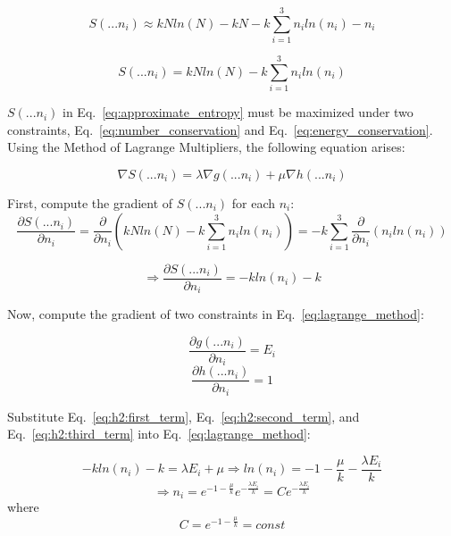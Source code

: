 \documentclass{article}
\begin{document}
\[
  S(...n_i) \approx kNln(N) - kN - k\sum_{i=1}^{3}{n_iln(n_i) - n_i}
\]

\begin{equation} \label{eq:approximate_entropy}
  S(...n_i) = kNln(N) - k\sum_{i=1}^{3}{n_iln(n_i)}
\end{equation}

$S(...n_i)$ in Eq.~\eqref{eq:approximate_entropy} must be maximized under two constraints, Eq.~\eqref{eq:number_conservation} and Eq.~\eqref{eq:energy_conservation}. Using the Method of Lagrange Multipliers, the following equation arises:

\begin{equation} \label{eq:lagrange_method}
  \nabla S(...n_i) = \lambda \nabla g(...n_i) + \mu \nabla h(...n_i)
\end{equation}

First, compute the gradient of $S(...n_i)$ for each $n_i$:
\begin{equation*}
  \frac{ \partial S(...n_i)} {\partial{n_i}} = \frac{ \partial }{\partial{n_i}} (kNln(N) - k\sum_{i=1}^{3}{n_iln(n_i)}) = -k
  \sum_{i=1}^{3}{\frac{\partial}{\partial{n_i}} (n_iln(n_i))}
\end{equation*}

\begin{equation} \label{eq:h2:first_term}
  \Rightarrow \frac { \partial S(...n_i) }{\partial n_i} = -kln(n_i) - k 
\end{equation}

Now, compute the gradient of two constraints in Eq.~\eqref{eq:lagrange_method}:

\begin{equation} \label{eq:h2:second_term}
  \frac{\partial g(...n_i)}{\partial n_i} = E_i
\end{equation}
\begin{equation} \label{eq:h2:third_term}
  \frac{\partial h(...n_i)}{\partial n_i} = 1
\end{equation}

Substitute Eq.~\eqref{eq:h2:first_term}, Eq.~\eqref{eq:h2:second_term}, and Eq.~\eqref{eq:h2:third_term} into Eq.~\eqref{eq:lagrange_method}:

\begin{equation*}
  -kln(n_i) - k = \lambda E_i + \mu \Rightarrow ln(n_i) = -1 - \frac{\mu}{k} - \frac{\lambda E_i}{k} 
\end{equation*}
\begin{equation}
  \Rightarrow n_i = e^{-1-\frac{\mu}{k}}e^{-\frac{\lambda E_i}{k}} = Ce^{-\frac{\lambda E_i}{k}}
\end{equation} where
\begin{equation*}
  C = e^{-1-\frac{\mu}{k}} = const
\end{equation*}
\end{document}

